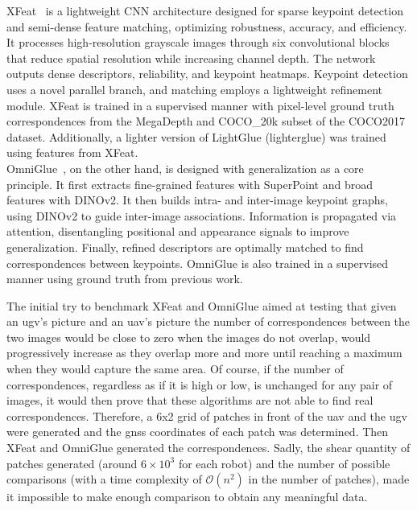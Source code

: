 XFeat~\cite{potje_xfeat_2024} is a lightweight CNN architecture designed for sparse keypoint detection and semi-dense
feature matching, optimizing robustness, accuracy, and efficiency.
It processes high-resolution grayscale images through six convolutional blocks that reduce spatial resolution while increasing channel depth.
The network outputs dense descriptors, reliability, and keypoint heatmaps.
Keypoint detection uses a novel parallel branch, and matching employs a lightweight refinement module.
XFeat is trained in a supervised manner with pixel-level ground truth correspondences from the MegaDepth and COCO\_20k subset of the COCO2017 dataset.
Additionally, a lighter version of LightGlue (lighterglue) was trained using features from XFeat.\\
OmniGlue~\cite{jiang_omniglue_2024}, on the other hand, is designed with generalization as a core principle.
It first extracts fine-grained features with SuperPoint and broad features with DINOv2.
It then builds intra- and inter-image keypoint graphs, using DINOv2 to guide inter-image associations.
Information is propagated via attention, disentangling positional and appearance signals to improve generalization.
Finally, refined descriptors are optimally matched to find correspondences between keypoints.
OmniGlue is also trained in a supervised manner using ground truth from previous work.


The initial try to benchmark XFeat and OmniGlue aimed at testing that given an \gls{ugv}'s picture and an \gls{uav}'s picture
the number of correspondences between the two images would be close to zero when the images do not overlap, would
progressively increase as they overlap more and more until reaching a maximum when they would capture the same area.
Of course, if the number of correspondences, regardless as if it is high or low, is unchanged for any pair of images,
it would then prove that these algorithms are not able to find real correspondences.
Therefore, a 6x2 grid of patches in front of the \gls{uav} and the \gls{ugv} were generated and the \gls{gnss} coordinates of each patch was determined.
Then XFeat and OmniGlue generated the correspondences.
Sadly, the shear quantity of patches generated (around $6 \times 10^3$ for each robot) and the number of possible comparisons
(with a time complexity of $\mathcal{O}(n^2)$ in the number of patches), made it impossible to make enough comparison to
obtain any meaningful data.



